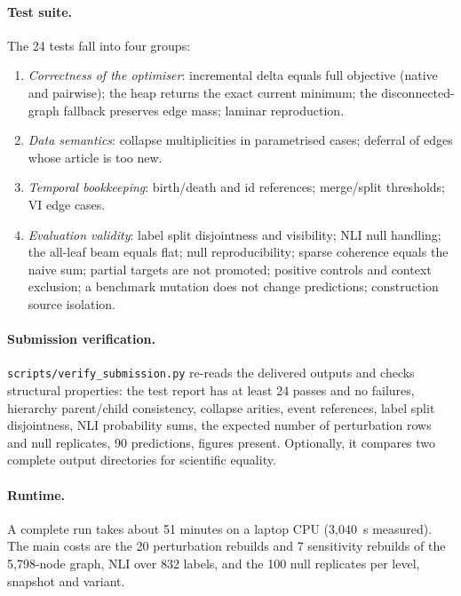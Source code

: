 \documentclass[11pt,a4paper]{article}
\theoremstyle{remark}
\newcommand{\code}[1]{\texttt{\small #1}}
\begin{document}
\paragraph{Test suite.}
The 24 tests fall into four groups:
\begin{enumerate}
  \item \emph{Correctness of the optimiser}: incremental delta equals full objective (native
        and pairwise); the heap returns the exact current minimum; the disconnected-graph
        fallback preserves edge mass; laminar reproduction.
  \item \emph{Data semantics}: collapse multiplicities in parametrised cases; deferral of
        edges whose article is too new.
  \item \emph{Temporal bookkeeping}: birth/death and id references; merge/split thresholds;
        VI edge cases.
  \item \emph{Evaluation validity}: label split disjointness and visibility; NLI null
        handling; the all-leaf beam equals flat; null reproducibility; sparse coherence
        equals the naive sum; partial targets are not promoted; positive controls and
        context exclusion; a benchmark mutation does not change predictions; construction
        source isolation.
\end{enumerate}

\paragraph{Submission verification.}
\code{scripts/verify\_submission.py} re-reads the delivered outputs and checks structural
properties: the test report has at least 24 passes and no failures, hierarchy
parent/child consistency, collapse arities, event references, label split disjointness, NLI
probability sums, the expected number of perturbation rows and null replicates, 90
predictions, figures present. Optionally, it compares two complete output directories for
scientific equality.

\paragraph{Runtime.}
A complete run takes about 51 minutes on a laptop CPU (3{,}040~s measured). The main costs
are the 20 perturbation rebuilds and 7 sensitivity rebuilds of the 5{,}798-node graph, NLI
over 832 labels, and the 100 null replicates per level, snapshot and variant.

\end{document}
